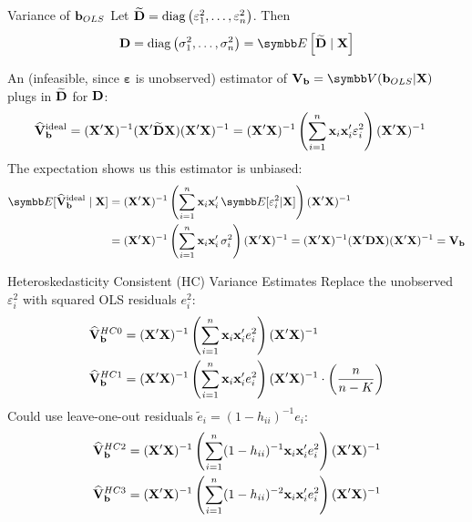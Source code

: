 \documentclass[aspectratio=169,11pt]{beamer}
\begin{document}
\begin{frame}{Variance of ${\bf b}_{OLS}$}
\small
Let $\widetilde{{\bf D}} = \operatorname{diag}\left(\varepsilon_1^2,\ldots,\varepsilon_n^2\right)$. Then
\begin{align*}
{\bf D} = \operatorname { diag } \left( \sigma _ { 1 } ^ { 2 } , \ldots , \sigma _ { n } ^ { 2 } \right)
= \E \left[ \widetilde{{\bf D}} \mid  {\bf X} \right]
\end{align*}

An (infeasible, since $\boldsymbol{\varepsilon}$ is unobserved) estimator of ${\bf V}_{{\bf b}} = \Var({\bf b}_{OLS}|{\bf X})$ plugs in $\widetilde{{\bf D}}$ for ${\bf D}$:
\begin{align*}
\widehat{{\bf V}}_{{\bf b}}^{\text{ideal}} &= ({\bf X}'{\bf X})^{-1} ({\bf X}'  \widetilde{{\bf D}} {\bf X}) ({\bf X}'{\bf X})^{-1}
= ({\bf X}'{\bf X})^{-1} \left(\sum_{i=1}^n {\bf x}_i {\bf x}_i' \varepsilon_i^2  \right) ({\bf X}'{\bf X})^{-1} 
\end{align*}
The expectation shows us this estimator is unbiased:
\begin{align*}
\E[\widehat{{\bf V}}_{{\bf b}}^{\text{ideal}} \mid {\bf X}] &= ({\bf X}'{\bf X})^{-1} \left(\sum_{i=1}^n {\bf x}_i {\bf x}_i'\, \E[\varepsilon_i^2 | {\bf X}] \right) ({\bf X}'{\bf X})^{-1} \\
&= ({\bf X}'{\bf X})^{-1} \left(\sum_{i=1}^n {\bf x}_i {\bf x}_i' \, \sigma_i^2 \right) ({\bf X}'{\bf X})^{-1} = ({\bf X}'{\bf X})^{-1} ({\bf X}' {\bf D} {\bf X}) ({\bf X}'{\bf X})^{-1} = {\bf V}_{{\bf b}}
\end{align*}
\end{frame}




\begin{frame}{Heteroskedasticity Consistent (HC) Variance Estimates}
Replace the unobserved $\varepsilon^2_i$ with squared OLS residuals $e_i^2$:
\begin{align*}
\widehat{{\bf V}}_{{\bf b}}^{HC0}&= ({\bf X}'{\bf X})^{-1} \left(\sum_{i=1}^n {\bf x}_i {\bf x}_i' e_i^2 \right) ({\bf X}'{\bf X})^{-1} \\
\widehat{{\bf V}}_{{\bf b}}^{HC1}&= ({\bf X}'{\bf X})^{-1} \left(\sum_{i=1}^n {\bf x}_i {\bf x}_i' e_i^2 \right) ({\bf X}'{\bf X})^{-1} \cdot \left(\frac{n}{n-K}  \right)
\end{align*}
Could use leave-one-out residuals $\tilde{e}_i = (1-h_{ii})^{-1}e_i$:
\begin{align*}
\widehat{{\bf V}}_{{\bf b}}^{HC2}&= ({\bf X}'{\bf X})^{-1} \left(\sum_{i=1}^n (1-h_{ii})^{-1} {\bf x}_i {\bf x}_i' e_i^2 \right) ({\bf X}'{\bf X})^{-1} \\
\widehat{{\bf V}}_{{\bf b}}^{HC3}&= ({\bf X}'{\bf X})^{-1} \left(\sum_{i=1}^n (1-h_{ii})^{-2} {\bf x}_i {\bf x}_i' e_i^2 \right) ({\bf X}'{\bf X})^{-1}
\end{align*}
\end{frame}
\end{document}
